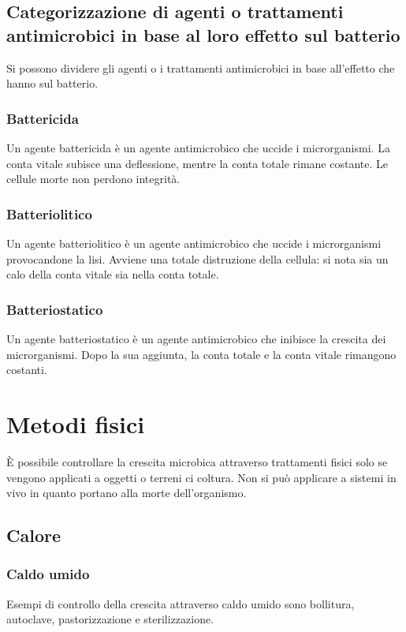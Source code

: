	\subsection{Categorizzazione di agenti o trattamenti antimicrobici in base al loro effetto sul batterio}
	Si possono dividere gli agenti o i trattamenti antimicrobici in base all'effetto che hanno sul batterio.

		\subsubsection{Battericida}
		Un agente battericida \`e un agente antimicrobico che uccide i microrganismi. 
		La conta vitale subisce una deflessione, mentre la conta totale rimane costante. 
		Le cellule morte non perdono integrit\`a.

		\subsubsection{Batteriolitico}
		Un agente batteriolitico \`e un agente antimicrobico che uccide i microrganismi provocandone la lisi. 
		Avviene una totale distruzione della cellula: si nota sia un calo della conta vitale sia nella conta totale.

		\subsubsection{Batteriostatico}
		Un agente batteriostatico \`e un agente antimicrobico che inibisce la crescita dei microrganismi. 
		Dopo la sua aggiunta, la conta totale e la conta vitale rimangono costanti.

\section{Metodi fisici}
\`E possibile controllare la crescita microbica attraverso trattamenti fisici solo se vengono applicati a oggetti o terreni ci coltura.
Non si pu\`o applicare a sistemi in vivo in quanto portano alla morte dell'organismo.

	\subsection{Calore}

		\subsubsection{Caldo umido}
		Esempi di controllo della crescita attraverso caldo umido sono bollitura, autoclave, pastorizzazione e sterilizzazione.

